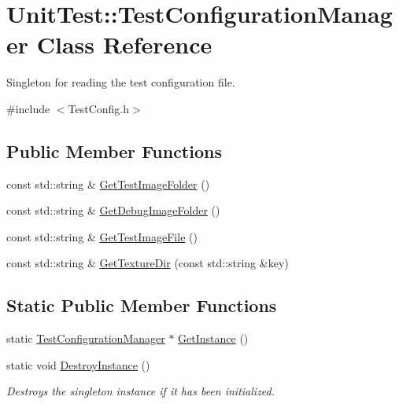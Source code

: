 \hypertarget{class_unit_test_1_1_test_configuration_manager}{}\section{Unit\+Test\+::Test\+Configuration\+Manager Class Reference}
\label{class_unit_test_1_1_test_configuration_manager}


Singleton for reading the test configuration file.  




{\ttfamily \#include $<$Test\+Config.\+h$>$}

\subsection*{Public Member Functions}
\begin{DoxyCompactItemize}
\item 
const std\+::string \& \mbox{\hyperlink{class_unit_test_1_1_test_configuration_manager_a246758c1638ac8a8966c7d0e8e02085b}{Get\+Test\+Image\+Folder}} ()
\item 
const std\+::string \& \mbox{\hyperlink{class_unit_test_1_1_test_configuration_manager_a85b5a37fb226434d0cf370875bb87b7c}{Get\+Debug\+Image\+Folder}} ()
\item 
const std\+::string \& \mbox{\hyperlink{class_unit_test_1_1_test_configuration_manager_a68bc437de34df3e796fc6fde731c4803}{Get\+Test\+Image\+File}} ()
\item 
const std\+::string \& \mbox{\hyperlink{class_unit_test_1_1_test_configuration_manager_a9467f8835450de0622c9be41cf88ed79}{Get\+Texture\+Dir}} (const std\+::string \&key)
\end{DoxyCompactItemize}
\subsection*{Static Public Member Functions}
\begin{DoxyCompactItemize}
\item 
static \mbox{\hyperlink{class_unit_test_1_1_test_configuration_manager}{Test\+Configuration\+Manager}} $\ast$ \mbox{\hyperlink{class_unit_test_1_1_test_configuration_manager_a0d67d9b3fda9041d13927c6d2d42085b}{Get\+Instance}} ()
\item 
\mbox{\label{class_unit_test_1_1_test_configuration_manager_a965b58cfa5a213da7a0f239f2b3f994f}} 
static void \mbox{\hyperlink{class_unit_test_1_1_test_configuration_manager_a965b58cfa5a213da7a0f239f2b3f994f}{Destroy\+Instance}} ()
\begin{DoxyCompactList}\small\item\em Destroys the singleton instance if it has been initialized. \end{DoxyCompactList}\end{DoxyCompactItemize}


